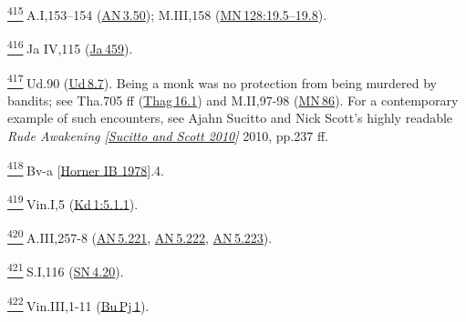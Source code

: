 \label{footprints_split_025.html_fn415}
\hyperref[footprints_split_012.htmlux5cux23fnref415]{\textsuperscript{415}} A.I,153--154
(\href{https://suttacentral.net/an3.50/en/sujato}{AN\,3.50}); M.III,158
(\href{https://suttacentral.net/mn128/en/sujato\#19.5}{MN\,128:19.5--19.8}).

\label{footprints_split_025.html_fn416}
\hyperref[footprints_split_012.htmlux5cux23fnref416]{\textsuperscript{416}} Ja
IV,115 (\href{https://suttacentral.net/ja459}{Ja\,459}).

\label{footprints_split_025.html_fn417}
\hyperref[footprints_split_012.htmlux5cux23fnref417]{\textsuperscript{417}} Ud.90
(\href{https://suttacentral.net/ud8.7/en/sujato}{Ud\,8.7}). Being a monk
was no protection from being murdered by bandits; see Tha.705 ff
(\href{https://suttacentral.net/thag16.1/en/sujato}{Thag\,16.1}) and
M.II,97-98 (\href{https://suttacentral.net/mn86/en/sujato}{MN\,86}). For
a contemporary example of such encounters, see Ajahn Sucitto and Nick
Scott's highly readable \emph{{Rude Awakening
{{[}\hyperref[footprints_split_023.htmlux5cux23Sucittoux5cux2520andux5cux2520Scottux5cux25202010]{Sucitto
and Scott 2010}{]}}}} 2010, pp.237 ff.

\label{footprints_split_025.html_fn418}
\hyperref[footprints_split_012.htmlux5cux23fnref418]{\textsuperscript{418}} {Bv-a
{{[}\hyperref[footprints_split_023.htmlux5cux23Hornerux5cux2520IBux5cux25201978]{Horner
IB 1978}{]}}}.4.

\label{footprints_split_025.html_fn419}
\hyperref[footprints_split_012.htmlux5cux23fnref419]{\textsuperscript{419}} Vin.I,5
(\href{https://suttacentral.net/pli-tv-kd1/en/brahmali?\#5.1.1}{Kd\,1:5.1.1}).

\label{footprints_split_025.html_fn420}
\hyperref[footprints_split_012.htmlux5cux23fnref420]{\textsuperscript{420}} A.III,257-8
(\href{https://suttacentral.net/an5.221/en/sujato}{AN\,5.221},
\href{https://suttacentral.net/an5.222/en/sujato}{AN\,5.222},
\href{https://suttacentral.net/an5.223/en/sujato}{AN\,5.223}).

\label{footprints_split_025.html_fn421}
\hyperref[footprints_split_012.htmlux5cux23fnref421]{\textsuperscript{421}} S.I,116
(\href{https://suttacentral.net/sn4.20/en/sujato}{SN\,4.20}).

\label{footprints_split_025.html_fn422}
\hyperref[footprints_split_012.htmlux5cux23fnref422]{\textsuperscript{422}} Vin.III,1-11
(\href{https://suttacentral.net/pli-tv-bu-vb-pj1/en/brahmali}{Bu\,Pj\,1}).


